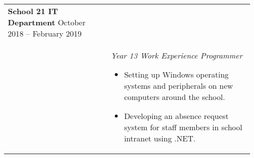 \documentclass[11pt]{article}
\begin{document}
\begin{minipage}[t][0pt]{\linewidth}
\begin{tabular}[t]{p{2cm} p{14cm}}
    	\textbf{School 21 IT Department}  \hfill October 2018 – February 2019 \\ &
		\textit{Year 13 Work Experience Programmer}
		\begin{itemize}
			\renewcommand{\labelitemi}{$\diamond$}
			\item Setting up Windows operating systems and peripherals on new computers around the school.
			\item Developing an absence request system for staff members in school intranet using .NET.
		\end{itemize} \\

\end{tabular}
\end{minipage}

\pagebreak
\end{document}
